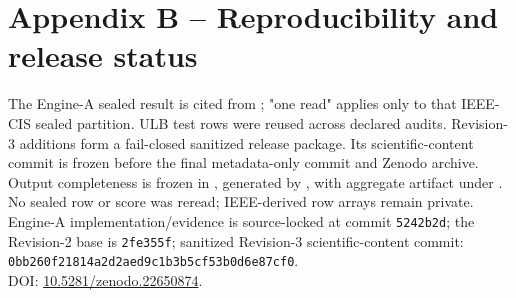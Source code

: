 \documentclass[10pt,a4paper]{article}
\begin{document}
\section*{Appendix B -- Reproducibility and release status}

The Engine-A sealed result is cited from
; "one read"
applies only to that IEEE-CIS sealed partition. ULB test rows were reused
across declared audits. Revision-3 additions form a fail-closed sanitized
release package. Its scientific-content commit is frozen before the final
metadata-only commit and Zenodo archive. Output completeness is frozen in
, generated by
, with aggregate
artifact under . No sealed row or
score was reread; IEEE-derived row arrays remain private.
Engine-A implementation/evidence is source-locked at commit
\texttt{5242b2d}; the Revision-2 base is \texttt{2fe355f}; sanitized Revision-3
scientific-content commit:\\
\texttt{0bb260f21814a2d2aed9c1b3b5cf53b0d6e87cf0}.\\
DOI: \href{https://doi.org/10.5281/zenodo.22650874}{10.5281/zenodo.22650874}.
\end{document}
